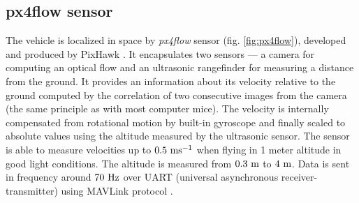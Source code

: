 \subsection{px4flow sensor}
\label{cap:px4flow}

The vehicle is localized in space by \textit{px4flow} sensor \citep{px4flow} (fig. \ref{fig:px4flow}), developed and produced by PixHawk \citep{pixhawk}. It encapsulates two sensors --- a camera for computing an optical flow and an ultrasonic rangefinder for measuring a distance from the ground. It provides an information about its velocity relative to the ground computed by the correlation of two consecutive images from the camera (the same principle as with most computer mice). The velocity is internally compensated from rotational motion by built-in gyroscope and finally scaled to absolute values using the altitude measured by the ultrasonic sensor. The sensor is able to measure velocities up to $0.5~\mathrm{ms^{-1}}$ when flying in 1 meter altitude in good light conditions. The altitude is measured from $0.3~\mathrm{m}$ to $4~\mathrm{m}$. Data is sent in frequency around $70~\mathrm{Hz}$ over UART (universal asynchronous receiver-transmitter) using MAVLink protocol \citep{px4flow}.

